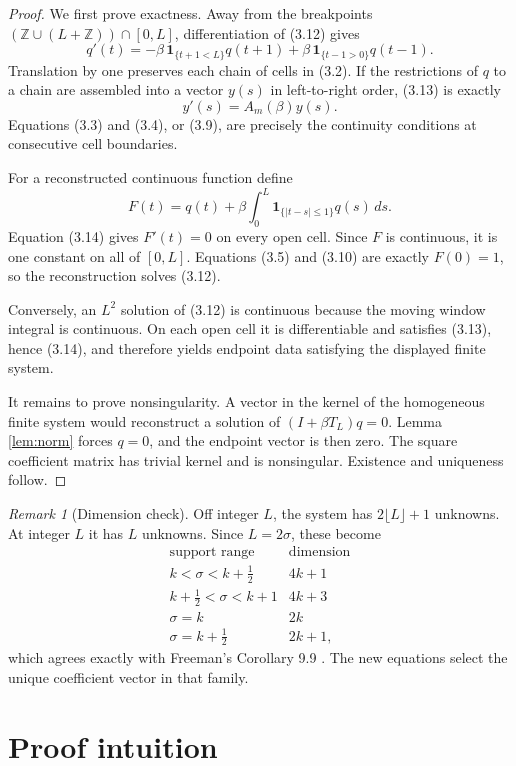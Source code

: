 \documentclass[11pt]{article}
\theoremstyle{definition}
\theoremstyle{remark}
\newtheorem{remark}[theorem]{Remark}
\newcommand{\1}{\mathbf 1}
\begin{document}
\begin{proof}
We first prove exactness. Away from the breakpoints
$(\mathbb Z\cup(L+\mathbb Z))\cap[0,L]$, differentiation of (3.12) gives
\[
 q'(t)=-\beta\,\1_{\{t+1<L\}}q(t+1)
        +\beta\,\1_{\{t-1>0\}}q(t-1).                    \tag{3.13}
\]
Translation by one preserves each chain of cells in (3.2). If the
restrictions of $q$ to a chain are assembled into a vector $y(s)$ in
left-to-right order, (3.13) is exactly
\[
 y'(s)=A_m(\beta)y(s).                                   \tag{3.14}
\]
Equations (3.3) and (3.4), or (3.9), are precisely the continuity
conditions at consecutive cell boundaries.

For a reconstructed continuous function define
\[
 F(t)=q(t)+\beta\int_0^L\1_{\{|t-s|\leq1\}}q(s)\,ds.
\]
Equation (3.14) gives $F'(t)=0$ on every open cell. Since $F$ is continuous,
it is one constant on all of $[0,L]$. Equations (3.5) and (3.10) are exactly
$F(0)=1$, so the reconstruction solves (3.12).

Conversely, an $L^2$ solution of (3.12) is continuous because the moving
window integral is continuous. On each open cell it is differentiable and
satisfies (3.13), hence (3.14), and therefore yields endpoint data satisfying
the displayed finite system.

It remains to prove nonsingularity. A vector in the kernel of the homogeneous
finite system would reconstruct a solution of
$(I+\beta T_L)q=0$. Lemma \ref{lem:norm} forces $q=0$, and the endpoint
vector is then zero. The square coefficient matrix has trivial kernel and is
nonsingular. Existence and uniqueness follow.
\end{proof}

\begin{remark}[Dimension check]
Off integer $L$, the system has $2\lfloor L\rfloor+1$ unknowns. At integer
$L$ it has $L$ unknowns. Since $L=2\sigma$, these become
\[
\begin{array}{c|c}
\text{support range}&\text{dimension}\\ \hline
k<\sigma<k+\tfrac12&4k+1\\
k+\tfrac12<\sigma<k+1&4k+3\\
\sigma=k&2k\\
\sigma=k+\tfrac12&2k+1,
\end{array}
\]
which agrees exactly with Freeman's Corollary 9.9 \cite{Freeman2017}. The
new equations select the unique coefficient vector in that family.
\end{remark}

\section{Proof intuition}
\end{document}

